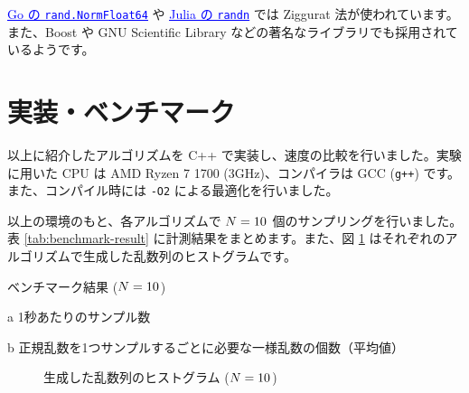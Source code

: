 \documentclass[twocolumn, dvipdfmx]{jsarticle}
\begin{document}
\href{https://github.com/golang/go/blob/be9379f8a8e2bfd924966020d177552d01833fdb/src/math/rand/normal.go}{\textcolor{blue}{\underline{Go の \texttt{rand.NormFloat64}}}} や \href{https://github.com/JuliaLang/julia/blob/ab05173c9539efb0aa82319f13672260a7b88076/stdlib/Random/src/normal.jl}{\textcolor{blue}{\underline{Julia の \texttt{randn}}}} では Ziggurat 法が使われています。また、Boost や GNU Scientific Library などの著名なライブラリでも採用されているようです。

\section*{実装・ベンチマーク}

以上に紹介したアルゴリズムを C++ で実装し、速度の比較を行いました。実験に用いた CPU は AMD Ryzen 7 1700 (3GHz)、コンパイラは GCC (\texttt{g++}) です。また、コンパイル時には \texttt{-O2} による最適化を行いました。

以上の環境のもと、各アルゴリズムで $N = 10^{\protect}$ 個のサンプリングを行いました。表 \ref{tab:benchmark-result} に計測結果をまとめます。また、図 \ref{fig:histogram} はそれぞれのアルゴリズムで生成した乱数列のヒストグラムです。

\begin{table}
    \caption{ベンチマーク結果 ($N = 10^{\protect}$)}
    \label{tab:benchmark-result}
    \begin{threeparttable}
        \centering
        
        \begin{tablenotes}
            \item[a] 1秒あたりのサンプル数
            \item[b] 正規乱数を1つサンプルするごとに必要な一様乱数の個数（平均値）
        \end{tablenotes}
    \end{threeparttable}
\end{table}

\begin{figure}[t]
    \centering
    \begin{subfigmatrix}{3}
    \end{subfigmatrix}
    \caption{生成した乱数列のヒストグラム ($N = 10^{\protect}$)}
    \label{fig:histogram}
\end{figure}
\end{document}
